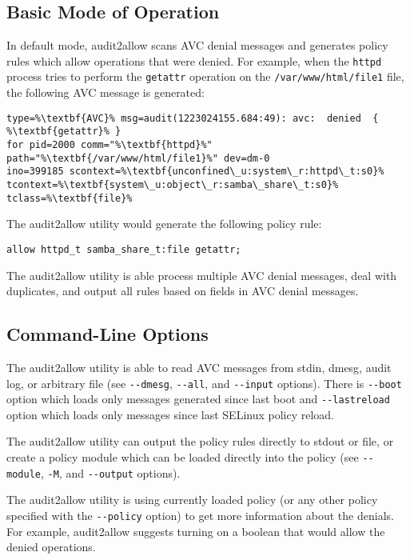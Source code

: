 \subsection{Basic Mode of Operation}
In default mode, audit2allow scans AVC denial messages and generates policy
rules which allow operations that were denied. For example, when the
\texttt{httpd} process tries to perform the \texttt{getattr} operation on the
\texttt{/var/www/html/file1} file, the following AVC message is generated:
\begin{lstlisting}[escapechar=\%]
type=%\textbf{AVC}% msg=audit(1223024155.684:49): avc:  denied  { %\textbf{getattr}% }
for pid=2000 comm="%\textbf{httpd}%" path="%\textbf{/var/www/html/file1}%" dev=dm-0
ino=399185 scontext=%\textbf{unconfined\_u:system\_r:httpd\_t:s0}%
tcontext=%\textbf{system\_u:object\_r:samba\_share\_t:s0}% tclass=%\textbf{file}%
\end{lstlisting}
The audit2allow utility would generate the following policy rule:
\begin{lstlisting}
allow httpd_t samba_share_t:file getattr;
\end{lstlisting}
The audit2allow utility is able process multiple AVC denial messages, deal with
duplicates, and output all rules based on fields in AVC denial messages.

\subsection{Command-Line Options}
The audit2allow utility is able to read AVC messages from stdin, dmesg, audit
log, or arbitrary file (see \texttt{-{}-dmesg}, \texttt{-{}-all}, and
\texttt{-{}-input} options). There is \texttt{-{}-boot} option which loads only
messages generated since last boot and \texttt{-{}-lastreload} option which
loads only messages since last SELinux policy reload.

The audit2allow utility can output the policy rules directly to stdout or file,
or create a policy module which can be loaded directly into the policy (see
\texttt{-{}-module}, \texttt{-M}, and \texttt{-{}-output} options).

The audit2allow utility is using currently loaded policy (or any other policy
specified with the \texttt{-{}-policy} option) to get more information about the
denials. For example, audit2allow suggests turning on a boolean that would allow
the denied operations.

